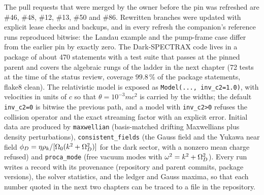 The pull requests that were merged by the owner before the pin was refreshed are \#46, \#48, \#12, \#13, \#50 and \#86. Rewritten branches were updated with explicit lease checks and backups, and in every refresh the companion's reference runs reproduced bitwise: the Landau example and the pump-frame case differ from the earlier pin by exactly zero. The Dark-SPECTRAX code lives in a package of about 470 statements with a test suite that passes at the pinned parent and covers the algebraic rungs of the ladder in the next chapter (72 tests at the time of the status review, coverage $99.8\,\%$ of the package statements, flake8 clean). The relativistic model is exposed as \texttt{Model(..., inv\_c2=1.0)}, with velocities in units of $c$ so that $\theta=10^{-3}mc^2$ is carried by the widths; the default \texttt{inv\_c2=0} is bitwise the previous path, and a model with \texttt{inv\_c2>0} refuses the collision operator and the exact streaming factor with an explicit error. Initial data are produced by \texttt{maxwellian} (basis-matched drifting Maxwellians plus density perturbations), \texttt{consistent\_fields} (the Gauss field and the Yukawa near field $\phi_D=\eta\rho_k/[\Omega_0(k^2+\Omega_D^2)]$ for the dark sector, with a nonzero mean charge refused) and \texttt{proca\_mode} (free vacuum modes with $\omega^2=k^2+\Omega_D^2$). Every run writes a record with its provenance (repository and parent commits, package versions), the solver statistics, and the ledger and Gauss maxima, so that each number quoted in the next two chapters can be traced to a file in the repository.
